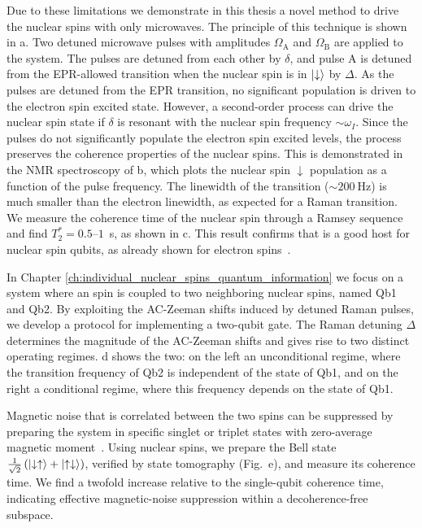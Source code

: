 Due to these limitations we demonstrate in this thesis a novel method to drive the nuclear spins with only microwaves. The principle of this technique is shown in a. Two detuned microwave pulses with amplitudes $\Omega_\text{A}$ and $\Omega_\text{B}$ are applied to the system. The pulses are detuned from each other by $\delta$, and pulse A is detuned from the EPR-allowed transition when the nuclear spin is in $\ket{\downarrow}$ by $\Delta$. As the pulses are detuned from the EPR transition, no significant population is driven to the electron spin excited state. However, a second-order process can drive the nuclear spin state if $\delta$ is resonant with the nuclear spin frequency $\sim\omega_I$. Since the pulses do not significantly populate the electron spin excited levels, the process preserves the coherence properties of the nuclear spins. This is demonstrated in the NMR spectroscopy of b, which plots the nuclear spin $\downarrow$ population as a function of the pulse frequency. The linewidth of the transition ($\sim200~\mathrm{Hz}$) is much smaller than the electron linewidth, as expected for a Raman transition. We measure the coherence time of the nuclear spin through a Ramsey sequence and find $T_2^*=0.5$--$1$~s, as shown in c. This result confirms that \Ca is a good host for nuclear spin qubits, as already shown for electron spins~.

In Chapter \ref{ch:individual_nuclear_spins_quantum_information} we focus on a system where an \Er spin is coupled to two neighboring \W nuclear spins, named Qb1 and Qb2. By exploiting the AC-Zeeman shifts induced by detuned Raman pulses, we develop a protocol for implementing a two-qubit gate. The Raman detuning $\Delta$ determines the magnitude of the AC-Zeeman shifts and gives rise to two distinct operating regimes. d shows the two: on the left an unconditional regime, where the transition frequency of Qb2 is independent of the state of Qb1, and on the right a conditional regime, where this frequency depends on the state of Qb1.

Magnetic noise that is correlated between the two spins can be suppressed by preparing the system in specific singlet or triplet states with zero-average magnetic moment~\cite{bartling_entanglement_2022, bradley_tenqubit_2019}. Using \W nuclear spins, we prepare the Bell state $\tfrac{1}{\sqrt2}\left(\ket{\downarrow\uparrow}+\ket{\uparrow\downarrow}\right)$, verified by state tomography (Fig.~e), and measure its coherence time. We find a twofold increase relative to the single-qubit coherence time, indicating effective magnetic-noise suppression within a decoherence-free subspace.

